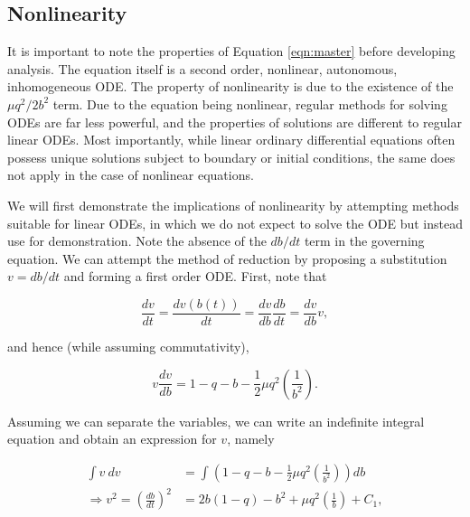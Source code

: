 \documentclass{article}
\begin{document}
\subsection{Nonlinearity}

It is important to note the properties of Equation \ref{eqn:master} before developing analysis.
The equation itself is a second order, nonlinear, autonomous, inhomogeneous ODE.
The property of nonlinearity is due to the existence of the $\mu q^2/2b^2$ term.
Due to the equation being nonlinear, regular methods for solving ODEs are far less powerful,
and the properties of solutions are different to regular linear ODEs.
Most importantly, while linear ordinary differential equations often possess unique solutions subject to boundary or initial conditions,
the same does not apply in the case of nonlinear equations.

We will first demonstrate the implications of nonlinearity by attempting methods suitable for linear ODEs,
in which we do not expect to solve the ODE but instead use for demonstration.
Note the absence of the $db/dt$ term in the governing equation.
We can attempt the method of reduction by proposing a substitution $v=db/dt$ and forming a first order ODE.
First, note that

\begin{equation}
    \frac{dv}{dt} = \frac{dv(b(t))}{dt} = \frac{dv}{db}\frac{db}{dt} = \frac{dv}{db}v,
\end{equation}

and hence (while assuming commutativity),

\begin{equation}
    v \frac{dv}{db} = 1 - q - b - \frac{1}{2}\mu q^2\left( \frac{1}{b^2} \right).
\end{equation}

Assuming we can separate the variables, we can write an indefinite integral equation and obtain an expression for $v$, namely

\begin{equation}
    \begin{aligned}
        \int v~dv                                      & = \int \left(1 - q - b - \frac{1}{2}\mu q^2\left( \frac{1}{b^2} \right)\right) db \\
        \Rightarrow v^2 = \left(\frac{db}{dt}\right)^2 & = 2b(1-q) - b^2 + \mu q^2\left(\frac{1}{b}\right) + C_1,
    \end{aligned}
    \label{eqn:first_order_reduction}
\end{equation}
\end{document}
